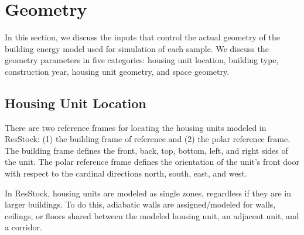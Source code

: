 \section{Geometry}

In this section, we discuss the inputs that control the actual geometry of the building energy model used for simulation of each sample. We discuss the geometry parameters in five categories: housing unit location, building type, construction year, housing unit geometry, and space geometry.

\subsection{Housing Unit Location}

There are two reference frames for locating the housing units modeled in ResStock: (1) the building frame of reference and (2) the polar reference frame. The building frame defines the front, back, top, bottom, left, and right sides of the unit. The polar reference frame defines the orientation of the unit's front door with respect to the cardinal directions north, south, east, and west.

In ResStock, housing units are modeled as single zones, regardless if they are in larger buildings. To do this, adiabatic walls are assigned/modeled for walls, ceilings, or floors shared between the modeled housing unit, an adjacent unit, and a corridor.

